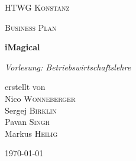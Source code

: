 \begin{titlepage}
	\centering
	{\scshape\LARGE HTWG Konstanz \par}
	\vspace{1cm}
	{\scshape\Large Business Plan\par}
	\vspace{1.5cm}
	{\huge\bfseries iMagical\par}
	\vspace{2cm}
	{\Large\itshape Vorlesung: Betriebswirtschaftslehre\par}
	\vfill
	erstellt von \\
	\vspace{0.5cm}
	Nico \textsc{Wonneberger} \\
	Sergej \textsc{Birklin} \\
	Pavan \textsc{Singh} \\
	Markus \textsc{Heilig}
	\vfill

	{\large \today\par}
\end{titlepage}